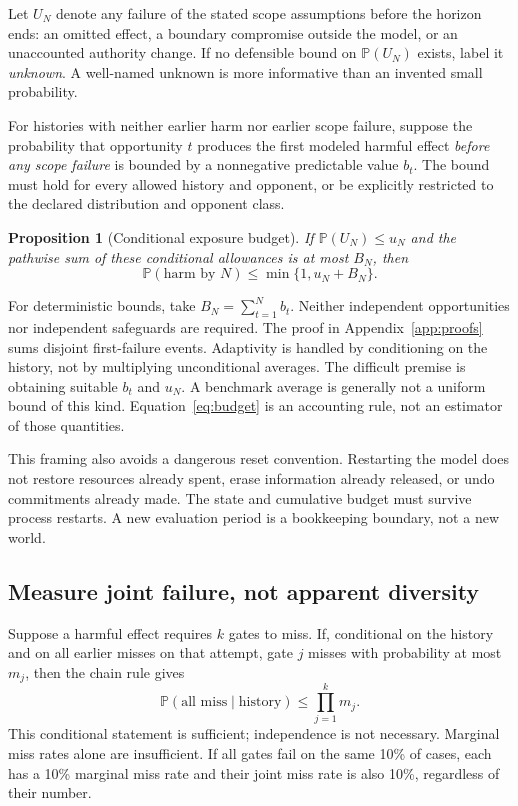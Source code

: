 \documentclass[10pt,twocolumn,letterpaper]{article}
\newtheorem{proposition}{Proposition}
\newcommand{\Prb}{\mathbb P}
\begin{document}
Let $U_N$ denote any failure of the stated scope assumptions before the horizon ends: an omitted effect, a boundary compromise outside the model, or an unaccounted authority change. If no defensible bound on $\Prb(U_N)$ exists, label it \emph{unknown}. A well-named unknown is more informative than an invented small probability.

For histories with neither earlier harm nor earlier scope failure, suppose the probability that opportunity $t$ produces the first modeled harmful effect \emph{before any scope failure} is bounded by a nonnegative predictable value $b_t$. The bound must hold for every allowed history and opponent, or be explicitly restricted to the declared distribution and opponent class.

\begin{proposition}[Conditional exposure budget]
\label{prop:budget}
If $\Prb(U_N)\le u_N$ and the pathwise sum of these conditional allowances is at most $B_N$, then
\begin{equation}
\Prb(\text{harm by }N)\le\min\{1,u_N+B_N\}.
\label{eq:budget}
\end{equation}
\end{proposition}

For deterministic bounds, take $B_N=\sum_{t=1}^{N}b_t$. Neither independent opportunities nor independent safeguards are required. The proof in Appendix~\ref{app:proofs} sums disjoint first-failure events. Adaptivity is handled by conditioning on the history, not by multiplying unconditional averages. The difficult premise is obtaining suitable $b_t$ and $u_N$. A benchmark average is generally not a uniform bound of this kind. Equation~\eqref{eq:budget} is an accounting rule, not an estimator of those quantities.

This framing also avoids a dangerous reset convention. Restarting the model does not restore resources already spent, erase information already released, or undo commitments already made. The state and cumulative budget must survive process restarts. A new evaluation period is a bookkeeping boundary, not a new world.

\subsection{Measure joint failure, not apparent diversity}
Suppose a harmful effect requires $k$ gates to miss. If, conditional on the history and on all earlier misses on that attempt, gate $j$ misses with probability at most $m_j$, then the chain rule gives
\begin{equation}
\Prb(\text{all miss}\mid\text{history})\le\prod_{j=1}^{k}m_j.
\label{eq:conditional}
\end{equation}
This conditional statement is sufficient; independence is not necessary. Marginal miss rates alone are insufficient. If all gates fail on the same 10\% of cases, each has a 10\% marginal miss rate and their joint miss rate is also 10\%, regardless of their number.
\end{document}
